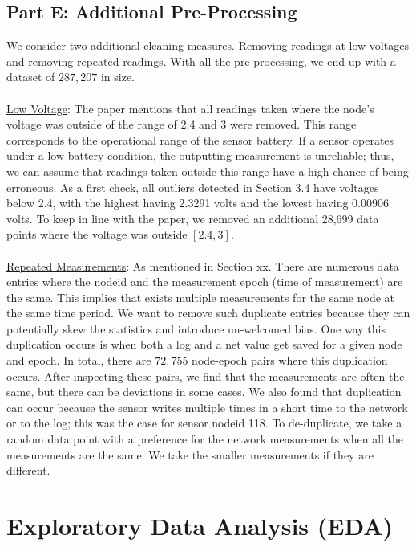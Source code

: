 \documentclass[11pt, letterpaper]{article}
\begin{document}
\subsection{Part E: Additional Pre-Processing}
We consider two additional cleaning measures. Removing readings at low voltages and removing repeated readings. With all the pre-processing, we end up with a dataset of $287,207$ in size.
\\ \\
\underline{Low Voltage}: The paper mentions that all readings taken where the node's voltage was outside of the range of 2.4 and 3 were removed. This range corresponds to the operational range of the sensor battery. If a sensor operates under a low battery condition, the outputting measurement is unreliable; thus, we can assume that readings taken outside this range have a high chance of being erroneous. As a first check, all outliers detected in Section 3.4 have voltages below 2.4, with the highest having 2.3291 volts and the lowest having 0.00906 volts. To keep in line with the paper, we removed an additional 28,699 data points where the voltage was outside $[2.4, 3]$.
\\ \\
\underline{Repeated Measurements}: As mentioned in Section xx. There are numerous data entries where the nodeid and the measurement epoch (time of measurement) are the same. This implies that exists multiple measurements for the same node at the same time period. We want to remove such duplicate entries because they can potentially skew the statistics and introduce un-welcomed bias. One way this duplication occurs is when both a log and a net value get saved for a given node and epoch. In total, there are $72,755$ node-epoch pairs where this duplication occurs. After inspecting these pairs, we find that the measurements are often the same, but there can be deviations in some cases. We also found that duplication can occur because the sensor writes multiple times in a short time to the network or to the log; this was the case for sensor nodeid 118. To de-duplicate, we take a random data point with a preference for the network measurements when all the measurements are the same. We take the smaller measurements if they are different. 


\section{Exploratory Data Analysis (EDA)}
\end{document}
